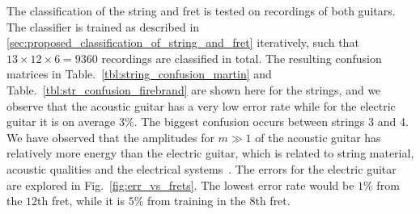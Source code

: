 \documentclass{article}
\begin{document}
%    
%
%
%
%
\label{sec:string_fret_classification}
The classification of the string and fret is tested on recordings of both guitars. 
The classifier is trained as described in \ref{sec:proposed_classification_of_string_and_fret} iteratively, such that $13\times12\times6 = 9360$ recordings are classified in total. The resulting confusion matrices in Table.~\ref{tbl:string_confusion_martin} and Table.~\ref{tbl:str_confusion_firebrand} are shown here for the strings, and we observe that the acoustic guitar has a very low error rate while for the electric guitar it is on average $3\%$. The biggest confusion occurs between strings 3 and 4. We have observed that the amplitudes for $m\gg1$ of the acoustic guitar has relatively more energy than the electric guitar, which is related to string material, acoustic qualities and the electrical systems~\cite{fletcher:physics_of_musical_instruments}.  
The errors for the electric guitar are explored in Fig.~\ref{fig:err_vs_frets}. The lowest error rate would be $1\%$ from the $12$th fret, while it is $5\%$ from training in the $8$th fret. %
%
\end{document}
